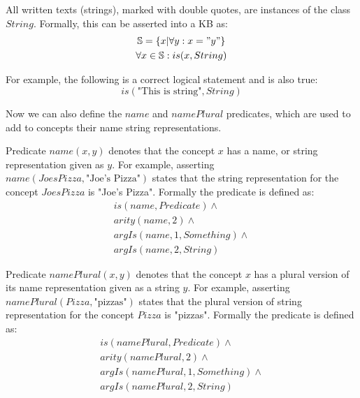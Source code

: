 \begin{definition}\label{def:string}
All written texts (strings), marked with double quotes, are instances of the 
class $String$. Formally, this can be
asserted into a KB as:
\begin{equation}\label{as:strings}
\begin{gathered}
	\mathbb{S}=\{x|\forall y:x="y"\} \\
	\forall x \in \mathbb{S}:is(x,String)
\end{gathered}
\end{equation}
\end{definition}
For example, the following is a correct logical statement and is also true:
\begin{equation*}
	is(\text{"This is string"},String)
\end{equation*}

Now we can also define the $name$ and $namePlural$ predicates, which are used 
to add to concepts their name string representations.

\begin{definition}\label{def:predName}
Predicate $name(x,y)$ denotes that the concept $x$ has a name, or string
representation given as $y$. For example, asserting 
\\$name(JoesPizza,\text{"Joe's Pizza"})$ states that the string representation
for the concept $JoesPizza$ is "Joe's Pizza". Formally the predicate is 
defined as:
\begin{equation}\label{as:predName}
\begin{gathered}
	is(name,Predicate)\land\\
	arity(name,2)\land\\
	argIs(name,1,Something)\land\\
	argIs(name,2,String)
\end{gathered}
\end{equation}
\end{definition}

\begin{definition}\label{def:predNamePlural}
Predicate $namePlural(x,y)$ denotes that the concept $x$ has a plural version of
its name representation given as a string $y$. For example, asserting 
\\$namePlural(Pizza,\text{"pizzas"})$ states that the plural version of 
string representation for the concept $Pizza$ is "pizzas". Formally the 
predicate is defined as:
\begin{equation}\label{as:predNamePlural}
\begin{gathered}
	is(namePlural,Predicate)\land\\
	arity(namePlural,2)\land\\
	argIs(namePlural,1,Something)\land\\
	argIs(namePlural,2,String)
\end{gathered}
\end{equation}
\end{definition}

